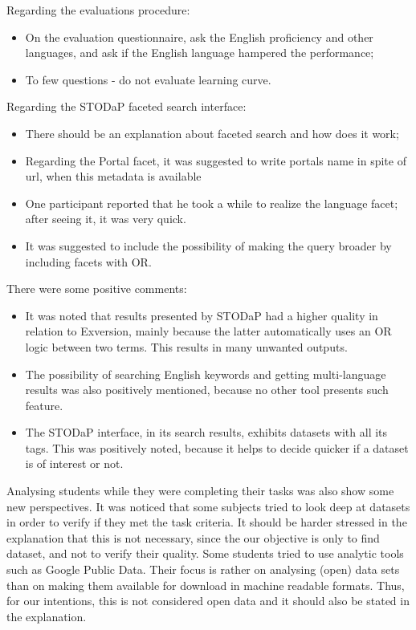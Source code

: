 Regarding the evaluations procedure:
\begin{itemize}
	\item On the evaluation questionnaire, ask the English proficiency and other languages, and ask if the English language hampered the performance;
	\item To few questions - do not evaluate learning curve.
\end{itemize}
	
Regarding the STODaP faceted search interface:
\begin{itemize}
	\item There should be an explanation about faceted search and how does it work;
	\item Regarding the Portal facet, it was suggested to write portals name in spite of url, when this metadata is available
	\item One participant reported that he took a while to realize the language facet; after seeing it, it was very quick.
	\item It was suggested to include the possibility of making the query broader by including facets with OR.
\end{itemize}	

There were some positive comments:
\begin{itemize}
	\item It was noted that results presented by STODaP had a higher quality in relation to Exversion, mainly because the latter automatically uses an OR logic between two terms.
	This results in many unwanted outputs.
	\item The possibility of searching English keywords and getting multi-language results was also positively mentioned, because no other tool presents such feature.
	\item The STODaP interface, in its search results, exhibits datasets with all its tags.
	This was positively noted, because it helps to decide quicker if a dataset is of interest or not.
\end{itemize}	

Analysing students while they were completing their tasks was also show some new perspectives.
It was noticed that some subjects tried to look deep at datasets in order to verify if they met the task criteria.
It should be harder stressed in the explanation that this is not necessary, since the our objective is only to find dataset, and not to verify their quality.
Some students tried to use analytic tools such as Google Public Data.
Their focus is rather on analysing (open) data sets than on making them available for download in machine readable formats.
Thus, for our intentions, this is not considered open data and it should also be stated in the explanation.


